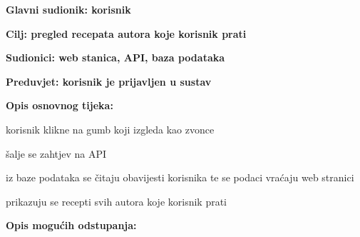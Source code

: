 					\noindent {}
					\begin{packed_item}
						\item \textbf{Glavni sudionik: korisnik}
						\item  \textbf{Cilj: pregled recepata autora koje korisnik prati}
						\item  \textbf{Sudionici: web stanica, API, baza podataka}
						\item  \textbf{Preduvjet: korisnik je prijavljen u sustav}
						
						\item  \textbf{Opis osnovnog tijeka:}
						\item[] \begin{packed_enum}
							\item korisnik klikne na gumb koji izgleda kao zvonce
							\item šalje se zahtjev na API
							\item iz baze podataka se čitaju obavijesti korisnika te se podaci vraćaju web stranici
							\item prikazuju se recepti svih autora koje korisnik prati
						\end{packed_enum}
						
						\item  \textbf{Opis mogućih odstupanja:}
						\item[] \begin{packed_item}							
						\end{packed_item}
					\end{packed_item}
				
				
				
